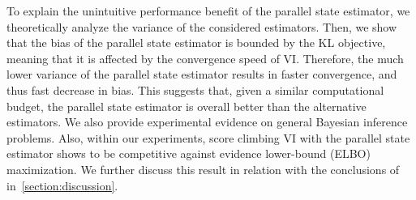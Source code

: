 To explain the unintuitive performance benefit of the parallel state estimator, we theoretically analyze the variance of the considered estimators.
Then, we show that the bias of the parallel state estimator is bounded by the KL objective, meaning that it is affected by the convergence speed of VI.
Therefore, the much lower variance of the parallel state estimator results in faster convergence, and thus fast decrease in bias.
This suggests that, given a similar computational budget, the parallel state estimator is overall better than the alternative estimators.
We also provide experimental evidence on general Bayesian inference problems.
Also, within our experiments, score climbing VI with the parallel state estimator shows to be competitive against evidence lower-bound  (ELBO) maximization.
We further discuss this result in relation with the conclusions of~\citet{dhaka_challenges_2021} in~\cref{section:discussion}.



